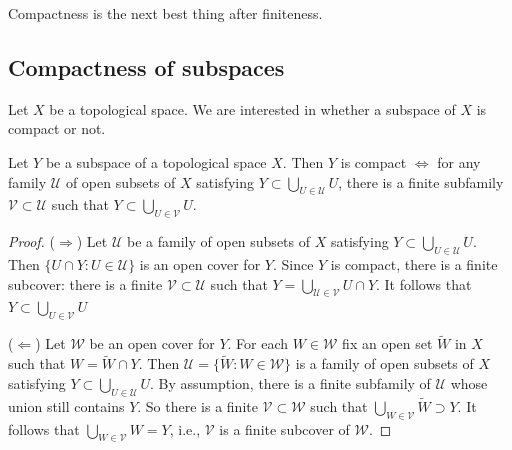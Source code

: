 \documentclass[a4paper,11pt]{article}
\begin{document}
\begin{remark}
    Compactness is the next best thing after finiteness.
\end{remark}

\subsection{Compactness of subspaces}
Let $X$ be a topological space. We are interested in whether a subspace of $X$ is compact or not.
\begin{lemma}\label{lma:compactness of subspaces}
    Let $Y$ be a subspace of a topological space $X$. Then $Y$ is compact $\Longleftrightarrow$ for any family $\mathcal{U}$ of open subsets of $X$ satisfying $Y \subset \bigcup_{U \in \mathcal{U}} U$, there is a finite subfamily $\mathcal{V} \subset \mathcal{U}$ such that $Y \subset \bigcup_{U \in \mathcal{V}} U$.
\end{lemma}
\begin{proof}
    ($\Longrightarrow $) Let $\mathcal{U}$ be a family of open subsets of $X$ satisfying $Y \subset \bigcup_{U \in \mathcal{U}} U$. Then $\{U \cap Y: U \in \mathcal{U}\}$ is an open cover for $Y$. Since $Y$ is compact, there is a finite subcover: there is a finite $\mathcal{V} \subset \mathcal{U}$ such that $Y=\bigcup_{\mathcal{U} \in \mathcal{V}} U \cap Y$. It follows that $Y \subset \bigcup_{U \in \mathcal{V}} U$

    ($\Longleftarrow$) Let $\mathcal{W}$ be an open cover for $Y$. For each $W \in \mathcal{W}$ fix an open set $\widetilde{W}$ in $X$ such that $W=\widetilde{W} \cap Y$. Then $\mathcal{U}=\{\widetilde{W}: W \in \mathcal{W}\}$ is a family of open subsets of $X$ satisfying $Y \subset \bigcup_{U \in \mathcal{U}} U$. By assumption, there is a finite subfamily of $\mathcal{U}$ whose union still contains $Y$. So there is a finite $\mathcal{V} \subset \mathcal{W}$ such that $\bigcup_{W \in \mathcal{V}} \widetilde{W} \supset Y$. It follows that $\bigcup_{W \in \mathcal{V}} W=Y$, i.e., $\mathcal{V}$ is a finite subcover of $\mathcal{W}$.
\end{proof}
\end{document}
